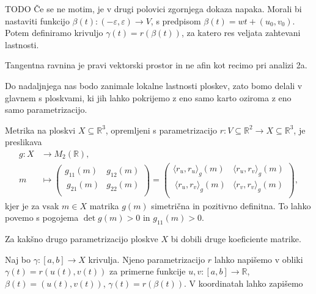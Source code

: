 \begin{opomba}
TODO
Če se ne motim, je v drugi polovici zgornjega dokaza napaka. Morali bi nastaviti funkcijo $\beta(t): (-\varepsilon, \varepsilon) \to V$,
s predpisom $\beta(t) = wt + (u_0, v_0)$. Potem definiramo krivuljo $\gamma(t) = r(\beta(t))$, za katero res veljata zahtevani lastnosti.
\end{opomba}



\begin{opomba}
 Tangentna ravnina je pravi vektorski prostor in ne afin kot
 recimo pri analizi 2a.
\end{opomba}

Do nadaljnjega nas bodo zanimale lokalne lastnosti ploskev, zato bomo
delali v glavnem s ploskvami, ki jih lahko pokrijemo z eno samo karto
oziroma z eno samo parametrizacijo.

\begin{definicija}
\label{def_metrika_na_ploskvi}
 Metrika na ploskvi $X \subseteq  \mathbb{R}^3$, opremljeni s
 parametrizacijo $r: V \subseteq  \mathbb{R}^2 \to  X \subseteq
 \mathbb{R}^3$, je preslikava \begin{align*}
 	g: X &\longrightarrow M_2(\mathbb{R}), \\
 	m &\longmapsto 
	\begin{pmatrix}
		g_{11}(m) & g_{12}(m) \\\
		g_{21}(m) & g_{22}(m) \\
	\end{pmatrix} = \begin{pmatrix}
		\langle r_u, r_u \rangle_g (m) & \langle r_u, r_v \rangle_g(m) \\\
		\langle r_u, r_v \rangle_g(m) & \langle r_v, r_v \rangle_g(m) \\
	\end{pmatrix},
 \end{align*}
 kjer je za vsak $m \in  X$ matrika $g(m)$ simetrična in pozitivno definitna. To lahko povemo s pogojema
 $\det g(m) > 0$ in $g_{11}(m) >0.$

\end{definicija}
\begin{opomba}
 Za kakšno drugo parametrizacijo ploskve $X$ bi dobili druge koeficiente
 matrike.
\end{opomba}
 Naj bo $\gamma: [a,b] \to  X$ krivulja. Njeno parametrizacijo $r$
lahko napišemo v obliki  $\gamma(t) = r(u(t), v(t))$ za primerne
funkcije $u,v : [a,b] \to \mathbb{R}$, $\beta(t) = (u(t), v(t))$,
$\gamma(t) = r(\beta(t)).$ V koordinatah lahko zapišemo 

